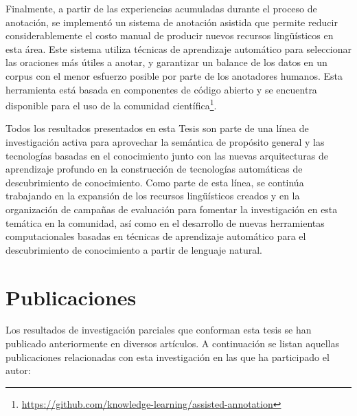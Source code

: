 Finalmente, a partir de las experiencias acumuladas durante el proceso de anotación, se implementó un sistema de anotación asistida que permite reducir considerablemente el costo manual de producir nuevos recursos lingüísticos en esta área.
Este sistema utiliza técnicas de aprendizaje automático para seleccionar las oraciones más útiles a anotar, y garantizar un balance de los datos en un corpus con el menor esfuerzo posible por parte de los anotadores humanos.
Esta herramienta está basada en componentes de código abierto y se encuentra disponible para el uso de la comunidad científica\footnote{\url{https://github.com/knowledge-learning/assisted-annotation}}.

Todos los resultados presentados en esta Tesis son parte de una línea de investigación activa para aprovechar la semántica de propósito general y las tecnologías basadas en el conocimiento junto con las nuevas arquitecturas de aprendizaje profundo en la construcción de tecnologías automáticas de descubrimiento de conocimiento.
Como parte de esta línea, se continúa trabajando en la expansión de los recursos lingüísticos creados y en la organización de campañas de evaluación para fomentar la investigación en esta temática en la comunidad, así como en el desarrollo de nuevas herramientas computacionales basadas en técnicas de aprendizaje automático para el descubrimiento de conocimiento a partir de lenguaje natural.

\section{Publicaciones}
\label{Chap:Conclusions-Publications}

Los resultados de investigación parciales que conforman esta tesis se han publicado anteriormente en diversos artículos. A continuación se listan aquellas publicaciones relacionadas con esta investigación en las que ha participado el autor:

